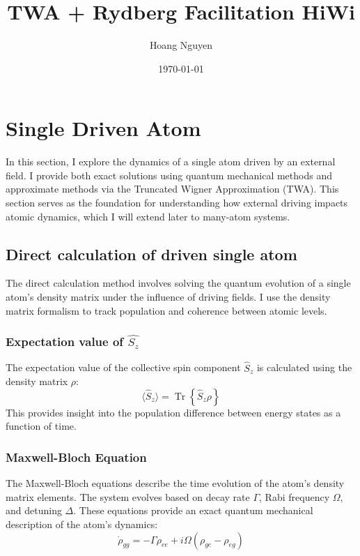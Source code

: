 \documentclass{article}
\title{TWA + Rydberg Facilitation HiWi}
\author{Hoang Nguyen}
\date{\today}
\begin{document}
\maketitle

    \section{Single Driven Atom}
    In this section, I explore the dynamics of a single atom driven by an external field. I provide both exact solutions using quantum mechanical methods and approximate methods via the Truncated Wigner Approximation (TWA). This section serves as the foundation for understanding how external driving impacts atomic dynamics, which I will extend later to many-atom systems.

    \subsection{Direct calculation of driven single atom}
    The direct calculation method involves solving the quantum evolution of a single atom's density matrix under the influence of driving fields. I use the density matrix formalism to track population and coherence between atomic levels.
    
    \subsubsection{Expectation value of $\hat{S_z}$}
    The expectation value of the collective spin component $\hat{S}_z$ is calculated using the density matrix $\rho$:
    \begin{equation}
        \langle \hat{S}_z \rangle = \operatorname{Tr}\left\{\hat{S}_z \rho\right\}
    \end{equation}
    This provides insight into the population difference between energy states as a function of time.

    \subsubsection{Maxwell-Bloch Equation}
    The Maxwell-Bloch equations describe the time evolution of the atom's density matrix elements. The system evolves based on decay rate $\Gamma$, Rabi frequency $\Omega$, and detuning $\Delta$. These equations provide an exact quantum mechanical description of the atom's dynamics:
    \begin{equation}
        \dot{\rho}_{gg} = -\Gamma \rho_{ee} + i \Omega (\rho_{ge} - \rho_{eg})
    \end{equation}
    
\end{document}
